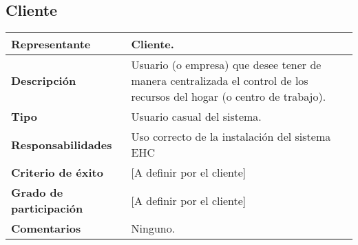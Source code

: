     \subsection{Cliente}
        \begin{tabular}{|p{4cm}|p{12cm}|}
            \hline \textbf{Representante} & Cliente. \\
            \hline \textbf{Descripción} & Usuario (o empresa) que desee  tener de manera centralizada el control de los recursos del hogar (o centro de trabajo). \\
            \hline \textbf{Tipo} & Usuario casual del sistema. \\
            \hline \textbf{Responsabilidades} & Uso correcto de la instalación del sistema EHC \\
            \hline \textbf{Criterio de éxito} & [A definir por el cliente] \\
            \hline \textbf{Grado de participación} & [A definir por el cliente] \\
            \hline \textbf{Comentarios} & Ninguno. \\
            \hline
        \end{tabular}

